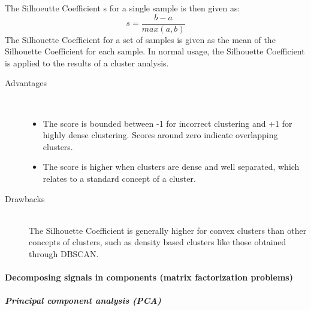 The Silhoeutte Coefficient s for a single sample is then given as:
\begin{equation}
s = \frac{b - a}{max(a, b)}
\end{equation}
The Silhouette Coefficient for a set of samples is given as the mean of the
 Silhouette Coefficient for each sample. In normal usage, the Silhouette
 Coefficient is applied to the results of a cluster analysis.

\begin{description}
	\item[Advantages] \hfill \\
	\begin{itemize}
		\item The score is bounded between -1 for incorrect
		clustering and +1 for highly dense clustering. Scores around
		 zero indicate overlapping clusters.
		\item The score is higher when clusters are dense and well
		 separated, which relates to a standard concept of a cluster.
	\end{itemize}
	\item[Drawbacks] \hfill \\
	The Silhouette Coefficient is generally higher for convex clusters
	than other concepts of clusters, such as density based clusters like
	 those obtained through DBSCAN.
\end{description}

\paragraph{Decomposing signals in components (matrix factorization problems)}
\label{paragraph:Decomposing}
\subparagraph{Principal component analysis (PCA)}
\label{subparagraph:PCA}

